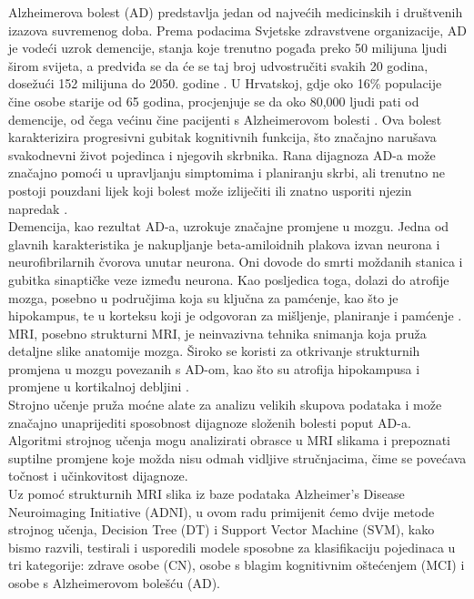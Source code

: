 \documentclass[zavrsnirad]{fer}
\begin{document}
Alzheimerova bolest (AD) predstavlja jedan od najvećih medicinskih i društvenih izazova suvremenog doba. Prema podacima Svjetske zdravstvene organizacije, AD je vodeći uzrok demencije, stanja koje trenutno pogađa preko 50 milijuna ljudi širom svijeta, a predviđa se da će se taj broj udvostručiti svakih 20 godina, dosežući 152 milijuna do 2050. godine \cite{PMID:29763097}. U Hrvatskoj, gdje oko 16\% populacije čine osobe starije od 65 godina, procjenjuje se da oko 80,000 ljudi pati od demencije, od čega većinu čine pacijenti s Alzheimerovom bolesti \cite{MIMICA2010409}. Ova bolest karakterizira progresivni gubitak kognitivnih funkcija, što značajno narušava svakodnevni život pojedinca i njegovih skrbnika. Rana dijagnoza AD-a može značajno pomoći u upravljanju simptomima i planiranju skrbi, ali trenutno ne postoji pouzdani lijek koji bolest može izliječiti ili znatno usporiti njezin napredak \cite{PMID:29763097}.
\\
Demencija, kao rezultat AD-a, uzrokuje značajne promjene u mozgu. Jedna od glavnih karakteristika je nakupljanje beta-amiloidnih plakova izvan neurona i neurofibrilarnih čvorova unutar neurona.\cite{10.1007/s00500-020-05292-x} Oni dovode do smrti moždanih stanica i gubitka sinaptičke veze između neurona. Kao posljedica toga, dolazi do atrofije mozga, posebno u područjima koja su ključna za pamćenje, kao što je hipokampus, te u korteksu koji je odgovoran za mišljenje, planiranje i pamćenje \cite{doi:10.1212/WNL.0b013e3181c3f293}.
\\
MRI, posebno strukturni MRI, je neinvazivna tehnika snimanja koja pruža detaljne slike anatomije mozga. Široko se koristi za otkrivanje strukturnih promjena u mozgu povezanih s AD-om, kao što su atrofija hipokampusa i promjene u kortikalnoj debljini \cite{10.3389/fnins.2015.00307}. 
\\
Strojno učenje pruža moćne alate za analizu velikih skupova podataka i može značajno unaprijediti sposobnost dijagnoze složenih bolesti poput AD-a. Algoritmi strojnog učenja mogu analizirati obrasce u MRI slikama i prepoznati suptilne promjene koje možda nisu odmah vidljive stručnjacima, čime se povećava točnost i učinkovitost dijagnoze.
\\
Uz pomoć strukturnih MRI slika iz baze podataka Alzheimer’s Disease Neuroimaging Initiative (ADNI), u ovom radu primijenit ćemo dvije metode strojnog učenja, Decision Tree (DT) i Support Vector Machine (SVM), kako bismo razvili, testirali i usporedili modele sposobne za klasifikaciju pojedinaca u tri kategorije: zdrave osobe (CN), osobe s blagim kognitivnim oštećenjem (MCI) i osobe s Alzheimerovom bolešću (AD).
\end{document}
